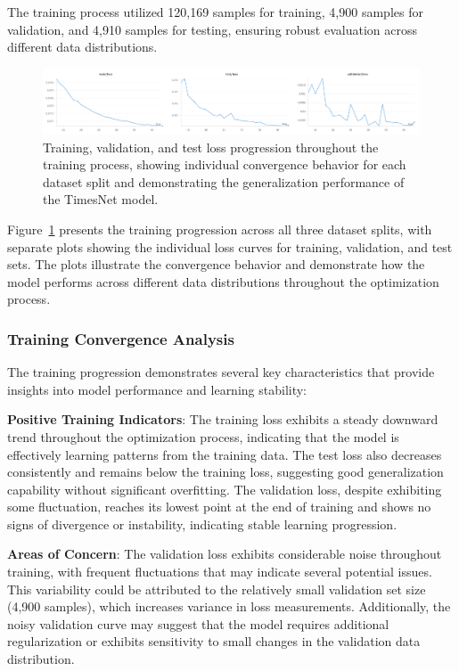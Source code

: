 The training process utilized 120,169 samples for training, 4,900 samples for validation, and 4,910 samples for testing, ensuring robust evaluation across different data distributions.

\begin{figure}[htbp]
\centering
\includegraphics[width=1.0\textwidth]{imgs/loss_funtions.png}
\caption{Training, validation, and test loss progression throughout the training process, showing individual convergence behavior for each dataset split and demonstrating the generalization performance of the TimesNet model.}
\label{fig:training_losses}
\end{figure}

Figure~\ref{fig:training_losses} presents the training progression across all three dataset splits, with separate plots showing the individual loss curves for training, validation, and test sets. The plots illustrate the convergence behavior and demonstrate how the model performs across different data distributions throughout the optimization process.

\subsubsection{Training Convergence Analysis}
\label{subsubsec:training_convergence}

The training progression demonstrates several key characteristics that provide insights into model performance and learning stability:

\textbf{Positive Training Indicators}: The training loss exhibits a steady downward trend throughout the optimization process, indicating that the model is effectively learning patterns from the training data. The test loss also decreases consistently and remains below the training loss, suggesting good generalization capability without significant overfitting. The validation loss, despite exhibiting some fluctuation, reaches its lowest point at the end of training and shows no signs of divergence or instability, indicating stable learning progression.

\textbf{Areas of Concern}: The validation loss exhibits considerable noise throughout training, with frequent fluctuations that may indicate several potential issues. This variability could be attributed to the relatively small validation set size (4,900 samples), which increases variance in loss measurements. Additionally, the noisy validation curve may suggest that the model requires additional regularization or exhibits sensitivity to small changes in the validation data distribution.

